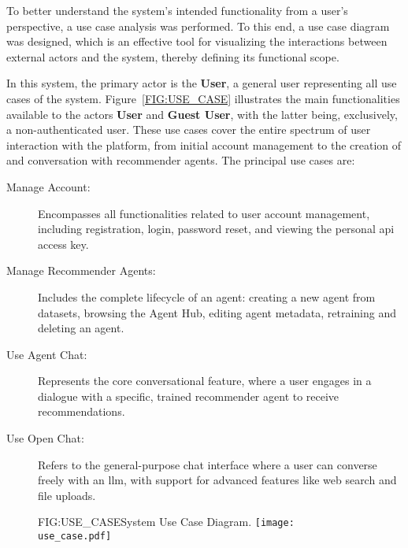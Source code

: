 To better understand the system's intended functionality from a user's perspective, a use case analysis was performed. To this end, a use case diagram was designed, which is an effective tool for visualizing the interactions between external actors and the system, thereby defining its functional scope.

In this system, the primary actor is the \textbf{User}, a general user representing all use cases of the system. Figure~\ref{FIG:USE_CASE} illustrates the main functionalities available to the actors \textbf{User} and \textbf{Guest User}, with the latter being, exclusively, a non-authenticated user. These use cases cover the entire spectrum of user interaction with the platform, from initial account management to the creation of and conversation with recommender agents. The principal use cases are:

\begin{description}
    \item[Manage Account:] Encompasses all functionalities related to user account management, including registration, login, password reset, and viewing the personal \acs{api} access key.
    \item[Manage Recommender Agents:] Includes the complete lifecycle of an agent: creating a new agent from datasets, browsing the Agent Hub, editing agent metadata, retraining and deleting an agent.
    \item[Use Agent Chat:] Represents the core conversational feature, where a user engages in a dialogue with a specific, trained recommender agent to receive recommendations.
    \item[Use Open Chat:] Refers to the general-purpose chat interface where a user can converse freely with an \ac{llm}, with support for advanced features like web search and file uploads.
\end{description}

\begin{figure}[System Use Case Diagram]{FIG:USE_CASE}{System Use Case Diagram.}
    \texttt{[image: use\_case.pdf]}
\end{figure}
